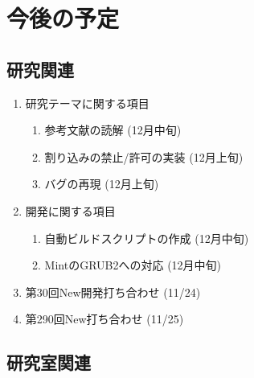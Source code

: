\documentclass[fleqn, 14pt]{extarticle}
\begin{document}
    \section{今後の予定}
    \label{sec-4}

    \subsection{研究関連}
    \label{sec-4-1}

    \begin{enumerate}

        \item 研究テーマに関する項目
            \hfill
            \begin{enumerate}

                \item 参考文献の読解
                    \hfill
                    (12月中旬)

                \item 割り込みの禁止/許可の実装
                    \hfill
                    (12月上旬)

                \item バグの再現
                    \hfill
                    (12月上旬)

            \end{enumerate}

        \item 開発に関する項目
            \hfill
            \begin{enumerate}

                \item 自動ビルドスクリプトの作成
                    \hfill
                    (12月中旬)

                \item MintのGRUB2への対応
                    \hfill
                    (12月中旬)

            \end{enumerate}

        \item 第30回New開発打ち合わせ
            \hfill
            \label{enum-7}
            (11/24)

        \item 第290回New打ち合わせ
            \hfill
            \label{enum-7}
            (11/25)

    \end{enumerate}

    \subsection{研究室関連}
    \label{sec-4-2}
\end{document}
